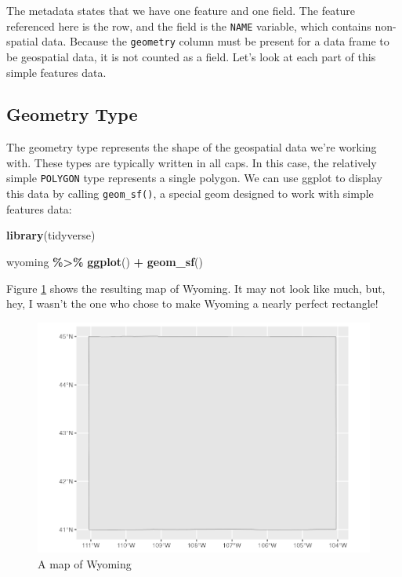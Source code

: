 \documentclass[
]{book}
\newenvironment{Shaded}{\begin{snugshade}}{\end{snugshade}}
\newcommand{\FunctionTok}[1]{\textcolor[rgb]{0.13,0.29,0.53}{\textbf{#1}}}
\newcommand{\NormalTok}[1]{#1}
\newcommand{\SpecialCharTok}[1]{\textcolor[rgb]{0.81,0.36,0.00}{\textbf{#1}}}
\begin{document}
The metadata states that we have one feature and one field. The feature referenced here is the row, and the field is the \texttt{NAME} variable, which contains non-spatial data. Because the \texttt{geometry} column must be present for a data frame to be geospatial data, it is not counted as a field. Let's look at each part of this simple features data.

\hypertarget{geometry-type}{%
\subsection*{Geometry Type}\label{geometry-type}}

The geometry type represents the shape of the geospatial data we're working with. These types are typically written in all caps. In this case, the relatively simple \texttt{POLYGON} type represents a single polygon. We can use ggplot to display this data by calling \texttt{geom\_sf()}, a special geom designed to work with simple features data:

\begin{Shaded}
\begin{Highlighting}[]
\FunctionTok{library}\NormalTok{(tidyverse)}

\NormalTok{wyoming }\SpecialCharTok{\%\textgreater{}\%}
  \FunctionTok{ggplot}\NormalTok{() }\SpecialCharTok{+}
  \FunctionTok{geom\_sf}\NormalTok{()}
\end{Highlighting}
\end{Shaded}

Figure \ref{fig:wyoming-map-plot} shows the resulting map of Wyoming. It may not look like much, but, hey, I wasn't the one who chose to make Wyoming a nearly perfect rectangle!

\begin{figure}
\includegraphics[width=1\linewidth]{maps_files/figure-latex/wyoming-map-plot-1} \caption{A map of Wyoming}\label{fig:wyoming-map-plot}
\end{figure}
\end{document}
